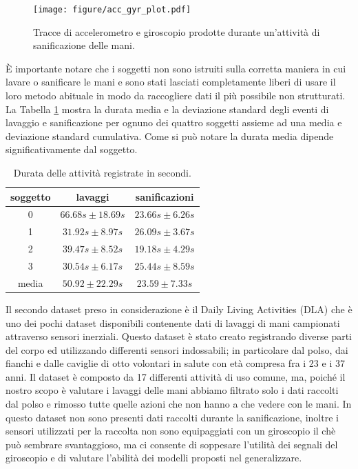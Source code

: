 \begin{figure}[!htb]
    \centering
    \texttt{[image: figure/acc\_gyr\_plot.pdf]}
    \caption{Tracce di accelerometro e giroscopio prodotte durante un'attività di sanificazione delle mani.}
    \label{fig:acc-gyro-plot}
\end{figure}

\`E importante notare che i soggetti non sono istruiti sulla corretta maniera in cui lavare o sanificare le mani e sono stati lasciati completamente liberi di usare il loro metodo abituale in modo da raccogliere dati il più possibile non strutturati. La Tabella \ref{tab:activity-duration} mostra la durata media e la deviazione standard degli eventi di lavaggio e sanificazione per ognuno dei quattro soggetti assieme ad una media e deviazione standard cumulativa. Come si può notare la durata media dipende significativamente dal soggetto.

\begin{table}
    \centering
    \begin{tabular}{c c c}
        \hline
        soggetto & lavaggi & sanificazioni  \\
        \hline
        0 & $66.68s \pm 18.69s$ & $23.66s \pm 6.26s$  \\
        1 & $31.92s \pm 8.97s$  & $26.09s \pm 3.67s$  \\
        2 & $39.47s \pm 8.52s$  & $19.18s \pm 4.29s$  \\
        3 & $30.54s \pm 6.17s$  & $25.44s \pm 8.59s$ \\
        \hline
        media & $50.92 \pm 22.29s$  & $23.59 \pm 7.33s$ \\
        \hline
    \end{tabular}
    \caption{Durata delle attività registrate in secondi.}
    \label{tab:activity-duration}
\end{table}

Il secondo dataset preso in considerazione è il Daily Living Activities (DLA) che è uno dei pochi dataset disponibili contenente dati di lavaggi di mani campionati attraverso sensori inerziali. Questo dataset è stato creato registrando diverse parti del corpo ed utilizzando differenti sensori indossabili; in particolare dal polso, dai fianchi e dalle caviglie di otto volontari in salute con età compresa fra i 23 e i 37 anni. Il dataset è composto da 17 differenti attività di uso comune, ma, poiché il nostro scopo è valutare i lavaggi delle mani abbiamo filtrato solo i dati raccolti dal polso e rimosso tutte quelle azioni che non hanno a che vedere con le mani. In questo dataset non sono presenti dati raccolti durante la sanificazione, inoltre i sensori utilizzati per la raccolta non sono equipaggiati con un giroscopio il chè può sembrare svantaggioso, ma ci consente di soppesare l'utilità dei segnali del giroscopio e di valutare l'abilità dei modelli proposti nel generalizzare.

